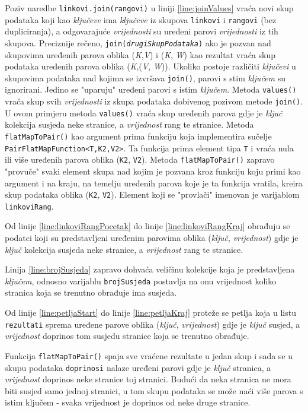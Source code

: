 \documentclass[times, utf8, zavrsni, numeric]{fer}
\begin{document}
Poziv naredbe \texttt{linkovi.join(rangovi)} u liniji \ref{line:joinValues} vraća novi skup podataka koji kao \emph{ključeve} ima \emph{ključeve} iz skupova \texttt{linkovi} i \texttt{rangovi} (bez dupliciranja), a odgovarajuće \emph{vrijednosti} su uređeni parovi \emph{vrijednosti} iz tih skupova. Preciznije rečeno, \texttt{join(\emph{drugiSkupPodataka})} ako je pozvan nad skupovima uređenih parova oblika (\emph{K},\emph{V}) i (\emph{K}, \emph{W}) kao rezultat vraća skup podataka uređenih parova oblika (\emph{K},(\emph{V}, \emph{W})). Ukoliko postoje različiti \emph{ključevi} u skupovima podataka nad kojima se izvršava \texttt{join()}, parovi s stim \emph{ključem} su ignorirani. Jedino se "uparuju" uređeni parovi s istim \emph{ključem}. Metoda \texttt{values()} vraća skup svih \emph{vrijednosti} iz skupa podataka dobivenog pozivom metode \texttt{join()}. U ovom primjeru metoda \texttt{values()} vraća skup uređenih parova gdje je \emph{ključ} kolekcija susjeda neke stranice, a \emph{vrijednost} rang te stranice. Metoda \texttt{flatMapToPair()} kao argument prima funkciju koja implementira sučelje \texttt{PairFlatMapFunction<T,K2,V2>}. Ta funkcija prima element tipa \texttt{T} i vraća nula ili više uređenih parova oblika (\texttt{K2}, \texttt{V2}). Metoda \texttt{flatMapToPair()} zapravo "provuče" svaki element skupa nad kojim je pozvana kroz funkciju koju primi kao argument i na kraju, na temelju uređenih parova koje je ta funkcija vratila, kreira skup podataka oblika (\texttt{K2}, \texttt{V2}). Element koji se "provlači" imenovan je varijablom \texttt{linkoviRang}.

Od linije \ref{line:linkoviRangPocetak} do linije \ref{line:linkoviRangKraj} obrađuju se podatci koji su predstavljeni uređenim parovima oblika (\emph{ključ}, \emph{vrijednost}) gdje je \emph{ključ} kolekcija susjeda neke stranice, a \emph{vrijednost} rang te stranice.

Linija \ref{line:brojSusjeda} zapravo dohvaća veličinu kolekcije koja je predstavljena \emph{ključem}, odnosno varijablu \texttt{brojSusjeda} postavlja na onu vrijednost koliko stranica koja se trenutno obrađuje ima susjeda. 

Od linije \ref{line:petljaStart} do linije \ref{line:petljaKraj} proteže se petlja koja u listu \texttt{rezultati} sprema uređene parove oblika (\emph{ključ}, \emph{vrijednost}) gdje je \emph{ključ} susjed, a \emph{vrijednost} doprinos tom susjedu stranice koja se trenutno obrađuje. 

Funkcija \texttt{flatMapToPair()} spaja sve vraćene rezultate u jedan skup i  sada se u skupu podataka \texttt{doprinosi} nalaze uređeni parovi gdje je \emph{ključ} stranica, a \emph{vrijednost} doprinos neke stranice toj stranici. Budući da neka stranica ne mora biti susjed samo jednoj stranici, u tom skupu podataka se može naći više parova s istim ključem - svaka vrijednost je doprinos od neke druge stranice. 
\end{document}
